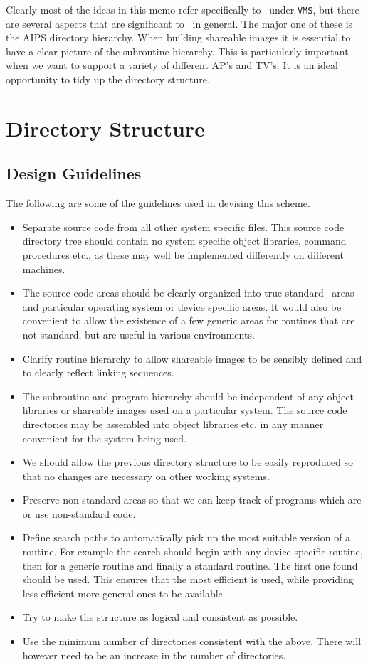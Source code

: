 Clearly most of the ideas in this memo refer specifically to \AIPS\ under
{\tt VMS\/}, but there are several aspects that are significant to
\AIPS\ in general. The major one of these is the AIPS directory
hierarchy.  When building shareable images it is essential to have a
clear picture of the subroutine hierarchy. This is particularly
important when we want to support a variety of different AP's and TV's.
It is an ideal opportunity to tidy up the directory structure.

\section{Directory Structure}
\subsection{Design Guidelines}

The following are some of the guidelines used in devising this scheme.

\begin{itemize}
  \item Separate source code from all other system specific files. This
	source code directory tree should contain no system specific
	object libraries, command procedures etc., as these may well be
	implemented differently on different machines.
  \item The source code areas should be clearly organized into true
	standard \AIPS\ areas and particular operating system or device
	specific areas.  It would also be convenient to allow the
	existence of a few generic areas for routines that are not
	standard, but are useful in various environments.
  \item Clarify routine hierarchy to allow shareable images to be
	sensibly defined and to clearly reflect linking sequences.
  \item The subroutine and program hierarchy should be independent of
	any object libraries or shareable images used on a particular
	system.  The source code directories may be assembled into
	object libraries etc. in any manner convenient for the system
	being used.
  \item We should allow the previous directory structure to be easily
	reproduced so that no changes are necessary on other working
	systems.
  \item Preserve non-standard areas so that we can keep track of
	programs which are or use non-standard code.
  \item Define search paths to automatically pick up the most suitable
	version of a routine. For example the search should begin with
	any device specific routine, then for a generic routine and
	finally a standard routine. The first one found should be used.
	This ensures that the most efficient is used, while providing
	less efficient more general ones to be available.
  \item Try to make the structure as logical and consistent as possible.
  \item Use the minimum number of directories consistent with the above.
	There will however need to be an increase in the number of
	directories.
\end{itemize}

